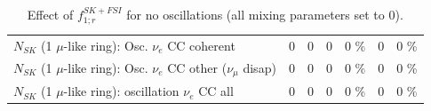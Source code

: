 \begin{table}
\begin{tabular}{| l | r | r | r  r | r  r |}
                          $N_{SK}$ (1 $\mu$-like ring): Osc. $\nu_e$ CC coherent &               0 &               0 &               0 &        0 \%  &               0 &        0 \%  \\ 
           $N_{SK}$ (1 $\mu$-like ring): Osc. $\nu_e$ CC other ($\nu_\mu$ disap) &               0 &               0 &               0 &        0 \%  &               0 &        0 \%  \\ 
                        $N_{SK}$ (1 $\mu$-like ring): oscillation $\nu_e$ CC all &               0 &               0 &               0 &        0 \%  &               0 &        0 \%  \\ 
\hline
\hline
\end{tabular}
\caption{ Effect of $f_{1; r}^{SK+FSI}$ for no oscillations (all mixing parameters set to 0). }
\label{tab:num_skdetfsi_001_1RmuT_3f_osc_t13:0_spectralreco_spectraltrue}
\end{table}
\clearpage
